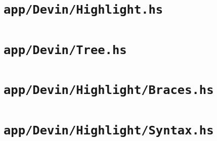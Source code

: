 \documentclass[UdineBachThesis,american,11pt]{PhdThesis}
\begin{document}
  \section{\texttt{app/Devin/Highlight.hs}}

  

  \section{\texttt{app/Devin/Tree.hs}}

  

  \section{\texttt{app/Devin/Highlight/Braces.hs}}

  

  \section{\texttt{app/Devin/Highlight/Syntax.hs}}

  

  \printbibliography[heading=bibintoc]
\end{document}
